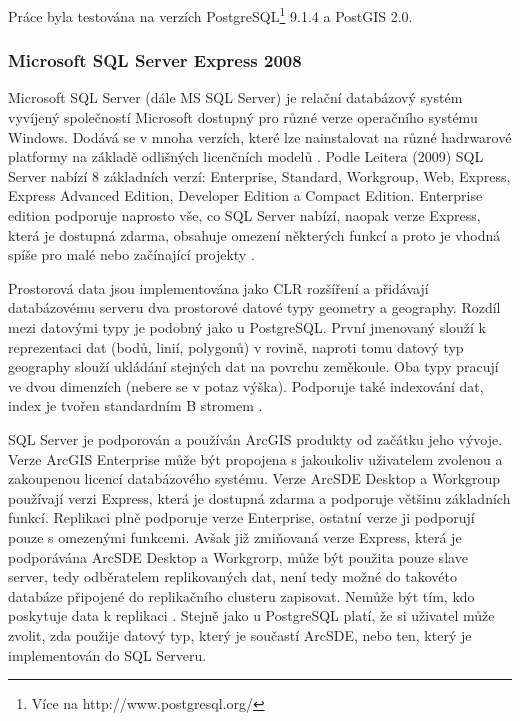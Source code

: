         Práce byla testována na verzích PostgreSQL\footnote{Více na
        http://www.postgresql.org/} 9.1.4 a PostGIS 2.0.

        \subsubsection{Microsoft SQL Server Express 2008}
        \label{MSSQL}
        Microsoft SQL Server (dále MS SQL Server) je relační databázový systém vyvíjený
        společností Microsoft dostupný pro různé verze operačního systému Windows.
        Dodává se v mnoha verzích, které lze nainstalovat na různé hadrwarové platformy
        na základě odlišných licenčních modelů \citep{Whalen2008}. Podle Leitera (2009)
        SQL Server nabízí 8 základních verzí: Enterprise, Standard, Workgroup, Web,
        Express, Express Advanced Edition, Developer Edition a Compact Edition.
        Enterprise edition podporuje naprosto vše, co SQL Server nabízí, naopak verze
        Express, která je dostupná zdarma, obsahuje omezení některých funkcí a proto je
        vhodná spíše pro malé nebo začínající projekty \citep{Leiter2009}.

        Prostorová data jsou implementována jako CLR rozšíření a přidávají databázovému
        serveru dva prostorové datové typy geometry a geography. Rozdíl mezi datovými
        typy je podobný jako u PostgreSQL. První jmenovaný slouží k reprezentaci dat
        (bodů, linií, polygonů) v rovině, naproti tomu datový typ geography slouží
        ukládání stejných dat na povrchu zeměkoule. Oba typy pracují ve dvou dimenzích
        (nebere se v potaz výška). Podporuje také indexování dat, index je tvořen
        standardním B stromem \citep{Cincura2009}.

        SQL Server je podporován a používán ArcGIS produkty od začátku jeho vývoje.
        Verze ArcGIS Enterprise může být propojena s jakoukoliv uživatelem zvolenou a
        zakoupenou licencí databázového systému. Verze ArcSDE Desktop a Workgroup
        používají verzi Express, která je dostupná zdarma a podporuje většinu
        základních funkcí. Replikaci plně podporuje verze Enterprise, ostatní verze ji
        podporují pouze s omezenými funkcemi. Avšak již zmiňovaná verze Express, která
        je podporávána ArcSDE Desktop a Workgrorp, může být použita pouze slave server,
        tedy odběratelem replikovaných dat, není tedy možné do takovéto databáze
        připojené do replikačního clusteru zapisovat. Nemůže být tím, kdo poskytuje
        data k replikaci \citep{Whalen2008}. Stejně jako u PostgreSQL platí, že si
        uživatel může zvolit, zda použije datový typ, který je součastí ArcSDE, nebo
        ten, který je implementován do SQL Serveru. 

